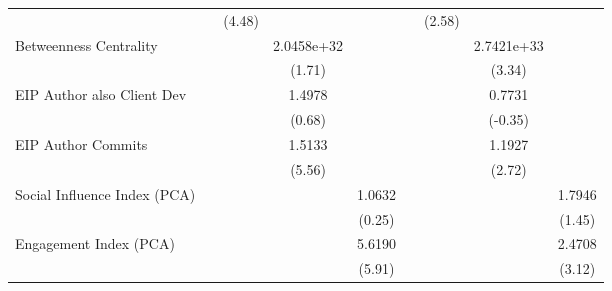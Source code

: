 {\begin{tabular}{l*{8}{c}}
                                   &                     &      (4.48)         &                     &                     &                     &      (2.58)         &                     &                     \\
[1em]
Betweenness Centrality             &                     &                     &  2.0458e+32\sym{*}  &                     &                     &                     &  2.7421e+33\sym{***}&                     \\
                                   &                     &                     &      (1.71)         &                     &                     &                     &      (3.34)         &                     \\
[1em]
EIP Author also Client Dev         &                     &                     &      1.4978         &                     &                     &                     &      0.7731         &                     \\
                                   &                     &                     &      (0.68)         &                     &                     &                     &     (-0.35)         &                     \\
[1em]
EIP Author Commits                 &                     &                     &      1.5133\sym{***}&                     &                     &                     &      1.1927\sym{***}&                     \\
                                   &                     &                     &      (5.56)         &                     &                     &                     &      (2.72)         &                     \\
[1em]
Social Influence Index (PCA)       &                     &                     &                     &      1.0632         &                     &                     &                     &      1.7946         \\
                                   &                     &                     &                     &      (0.25)         &                     &                     &                     &      (1.45)         \\
[1em]
Engagement Index (PCA)             &                     &                     &                     &      5.6190\sym{***}&                     &                     &                     &      2.4708\sym{***}\\
                                   &                     &                     &                     &      (5.91)         &                     &                     &                     &      (3.12)         \\

\end{tabular}}
